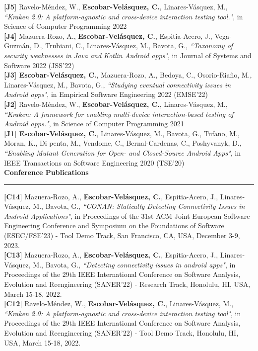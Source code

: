 \documentclass[letterpaper,11pt,oneside]{article}
\begin{document}
\noindent \textbf{[J5]} Ravelo-Méndez, W., \textbf{Escobar-Velásquez, C.},  Linares-Vásquez, M., \textit{``Kraken 2.0: A platform-agnostic and cross-device interaction testing tool."}, in Science of Computer Programming 2022\\
\noindent \textbf{[J4]} Mazuera-Rozo, A., \textbf{Escobar-Velásquez, C.}, Espitia-Acero, J., Vega-Guzm\'an, D., Trubiani, C., Linares-V\'asquez, M., Bavota, G., \textit{``Taxonomy of security weaknesses in Java and Kotlin Android apps"}, in Journal of Systems and Software 2022 (JSS'22)\\
\noindent \textbf{[J3] Escobar-Velásquez, C.}, Mazuera-Rozo, A., Bedoya, C., Osorio-Riaño, M., Linares-Vásquez, M., Bavota, G., \textit{``Studying eventual connectivity issues in Android apps"}, in Empirical Software Engineering 2022 (EMSE'22)\\
\noindent \textbf{[J2]} Ravelo-Méndez, W., \textbf{Escobar-Velásquez, C.},  Linares-Vásquez, M., \textit{``Kraken: A framework for enabling multi-device interaction-based testing of Android apps."}, in Science of Computer Programming 2021\\
\noindent \textbf{[J1] Escobar-Velásquez, C.}, Linares-V\'asquez, M., Bavota, G., Tufano, M., Moran, K., Di penta, M., Vendome, C., Bernal-Cardenas, C., Poshyvanyk, D., \textit{``Enabling Mutant Generation for Open- and Closed-Source Android Apps"}, in IEEE Transactions on Software Engineering 2020 (TSE’20)\\
\noindent \Large{\textbf{Conference Publications}} \\
\vspace{-2ex}
\hrule 
\normalsize
\vspace{2ex}
\noindent \textbf{[C14]} Mazuera-Rozo, A., \textbf{Escobar-Velásquez, C.}, Espitia-Acero, J., Linares-V\'asquez, M., Bavota, G., \textit{``CONAN: Statically Detecting Connectivity Issues in Android Applications"}, in Proceedings of the 31st ACM Joint European Software Engineering Conference and Symposium on the Foundations of Software (ESEC/FSE'23) - Tool Demo Track, San Francisco, CA, USA, December 3-9, 2023. \\
\noindent \textbf{[C13]} Mazuera-Rozo, A., \textbf{Escobar-Velásquez, C.}, Espitia-Acero, J., Linares-V\'asquez, M., Bavota, G., \textit{``Detecting connectivity issues in android apps"}, in Proceedings of the 29th IEEE International Conference on Software Analysis, Evolution and Reengineering (SANER'22) - Research Track, Honolulu, HI, USA, March 15-18, 2022. \\
\noindent \textbf{[C12]} Ravelo-Méndez, W., \textbf{Escobar-Velásquez, C.},  Linares-Vásquez, M., \textit{``Kraken 2.0: A platform-agnostic and cross-device interaction testing tool"}, in Proceedings of the 29th IEEE International Conference on Software Analysis, Evolution and Reengineering (SANER'22) - Tool Demo Track, Honolulu, HI, USA, March 15-18, 2022. \\
\end{document}
